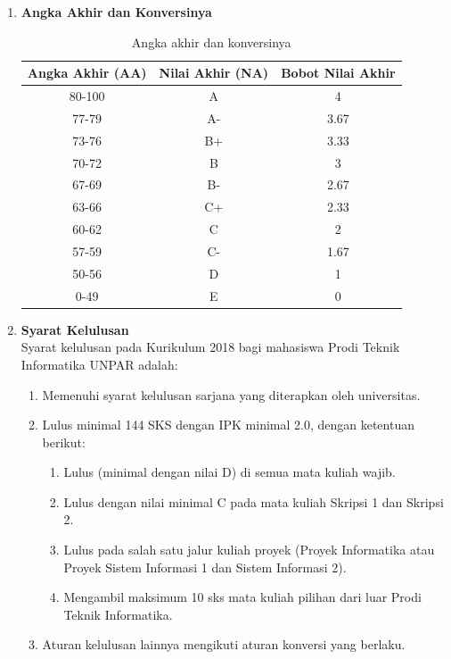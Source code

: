 \documentclass[a4paper,twoside]{article}
\begin{document}
\begin{enumerate}
\begin{enumerate}
			\item \textbf{Angka Akhir dan Konversinya} \\
			
			\begin{table}[H]
				\centering
				\caption{Angka akhir dan konversinya}
					\begin{tabular}{|c|c|c|}
						\hline
						Angka Akhir (AA) & Nilai Akhir (NA) & Bobot Nilai Akhir \\ \hline
						80-100         & A                & 4                 \\ \hline
						77-79          & A-               & 3.67              \\ \hline
						73-76          & B+               & 3.33              \\ \hline
						70-72          & B                & 3                 \\ \hline
						67-69          & B-               & 2.67              \\ \hline
						63-66          & C+               & 2.33              \\ \hline
						60-62          & C                & 2                 \\ \hline
						57-59          & C-               & 1.67              \\ \hline
						50-56          & D                & 1                 \\ \hline
						0-49           & E                & 0                 \\ \hline
					\end{tabular}
				\label{tab:AngkaAkhirDanKonversinya}
			\end{table}
			
			\item \textbf{Syarat Kelulusan} \\ 
			Syarat kelulusan pada Kurikulum 2018 bagi mahasiswa Prodi Teknik Informatika UNPAR adalah:
			\begin{enumerate}
				\item Memenuhi syarat kelulusan sarjana yang diterapkan oleh universitas.
				\item Lulus minimal 144 SKS dengan IPK minimal 2.0, dengan ketentuan berikut:
				\begin{enumerate}
					\item Lulus (minimal dengan nilai D) di semua mata kuliah wajib.
					\item Lulus dengan nilai minimal C pada mata kuliah Skripsi 1 dan Skripsi 2.
					\item Lulus pada salah satu jalur kuliah proyek (Proyek Informatika atau Proyek Sistem Informasi 1 dan Sistem Informasi 2).
					\item Mengambil maksimum 10 sks mata kuliah pilihan dari luar Prodi Teknik Informatika.
				\end{enumerate}
				\item Aturan kelulusan lainnya mengikuti aturan konversi yang berlaku.
			\end{enumerate}
			

\end{enumerate}
\end{enumerate}
\end{document}
